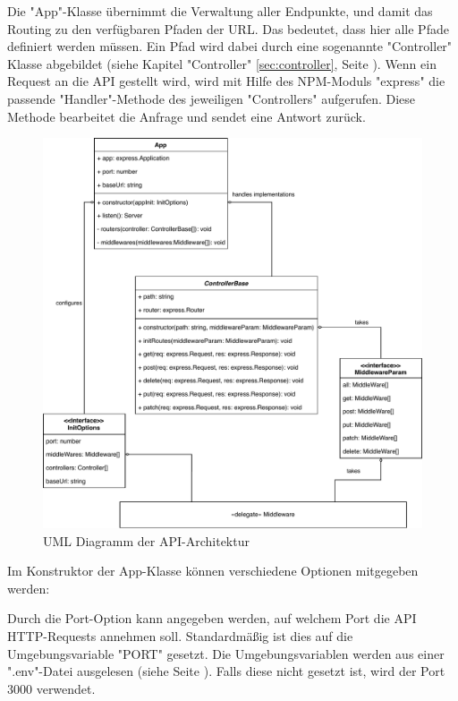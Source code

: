 \label{sec:app}

Die "App"-Klasse übernimmt die Verwaltung aller Endpunkte, und damit das Routing zu den verfügbaren Pfaden der URL.
Das bedeutet, dass hier alle Pfade definiert werden müssen. 
Ein Pfad wird dabei durch eine sogenannte "Controller" Klasse abgebildet (siehe Kapitel "Controller" \ref{sec:controller}, Seite \pageref{sec:controller}). 
Wenn ein Request an die API gestellt wird, wird mit Hilfe des NPM-Moduls "express" die passende "Handler"-Methode des jeweiligen "Controllers" aufgerufen. 
Diese Methode bearbeitet die Anfrage und sendet eine Antwort zurück.

\begin{figure}[H]
    \centering
    \includegraphics[width=\textwidth]{media/APITemplate/apiArchitecture.svg.pdf}
    \caption{UML Diagramm der API-Architektur}
    \label{fig:apiUML}
\end{figure}

\pagebreak

\label{sec:appConstructor}

Im Konstruktor der App-Klasse können verschiedene Optionen mitgegeben werden:


Durch die Port-Option kann angegeben werden, auf welchem Port die API HTTP-Requests annehmen soll. Standardmäßig ist dies auf die Umgebungsvariable "PORT" gesetzt. Die Umgebungsvariablen werden aus einer ".env"-Datei ausgelesen (siehe Seite \pageref{par:dockerEnvFile}). Falls diese nicht gesetzt ist, wird der Port 3000 verwendet.

